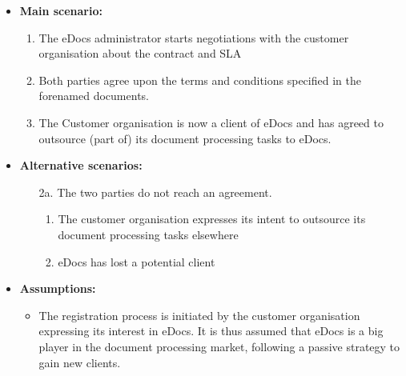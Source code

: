 \documentclass[a4paper,10pt]{article}
\begin{document}
\begin{itemize}
    \item \textbf{Main scenario:} 
    \begin{enumerate}
       \item The eDocs administrator starts negotiations with the customer organisation about the contract and SLA
       \item Both parties agree upon the terms and conditions specified in the forenamed documents.
       \item The Customer organisation is now a client of eDocs and has agreed to outsource (part of) its document processing tasks to eDocs.
    \end{enumerate}
    \item \textbf{Alternative scenarios:} 
    \begin{enumerate}
        \item [2a.] The two parties do not reach an agreement.
        \begin{enumerate}
        \item The customer organisation expresses its intent to outsource its document processing tasks elsewhere
        \item  eDocs has lost a potential client
        \end{enumerate}
        
    \end{enumerate}
    
    \item \textbf{Assumptions:}
        \begin{itemize}
            \item The registration process is initiated by the customer organisation expressing its interest in eDocs. It is thus assumed that eDocs is a big player in the document processing market, following a passive strategy to gain new clients.
        \end{itemize}
\end{itemize}
\end{document}

